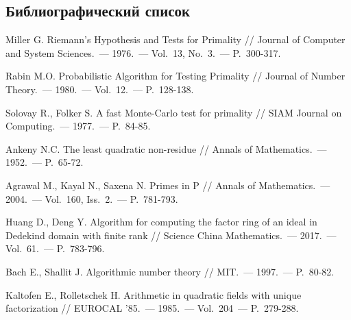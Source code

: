 \documentclass[_00_dissertation.tex]{subfiles}
\begin{document}

\renewcommand{\bibname}{Список использованных источников}

\begin{thebibliography}{99}
\section*{Библиографический список}
\vspace{-12pt}

    Miller G. Riemann's Hypothesis and Tests for Primality // Journal of Computer and System Sciences.~--- 1976.~--- Vol.~13, No.~3.~--- P.~300-317.

    Rabin M.O. Probabilistic Algorithm for Testing Primality // Journal of Number Theory.~--- 1980.~--- Vol.~12.~--- P.~128-138.

    Solovay R., Folker S. A fast Monte-Carlo test for primality // SIAM Journal on Computing.~--- 1977.~--- P.~84-85.

    Ankeny N.C. The least quadratic non-residue // Annals of Mathematics.~--- 1952.~--- P.~65-72.

    Agrawal M., Kayal N., Saxena N. Primes in P // Annals of Mathematics.~--- 2004.~--- Vol.~160, Iss.~2.~--- P.~781-793.

    Huang D., Deng Y. Algorithm for computing the factor ring of an ideal in Dedekind domain with finite rank // Science China Mathematics.~--- 2017.~--- Vol.~61.~--- P.~783-796.

    Bach E., Shallit J. Algorithmic number theory // MIT.~--- 1997.~--- P.~80-82.

    Kaltofen E., Rolletschek H. Arithmetic in quadratic fields with unique factorization // EUROCAL '85.~--- 1985.~--- Vol.~204~--- P.~279-288.


\end{thebibliography}
\end{document}
